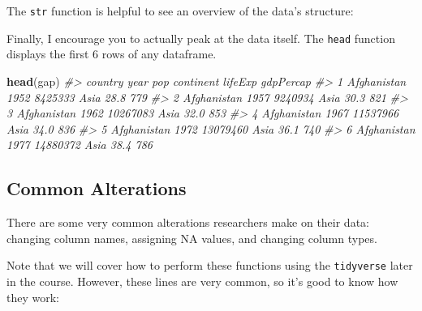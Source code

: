 \documentclass[]{book}
\newenvironment{Shaded}{\begin{snugshade}}{\end{snugshade}}
\newcommand{\CommentTok}[1]{\textcolor[rgb]{0.56,0.35,0.01}{\textit{#1}}}
\newcommand{\KeywordTok}[1]{\textcolor[rgb]{0.13,0.29,0.53}{\textbf{#1}}}
\newcommand{\NormalTok}[1]{#1}
\begin{document}
The \texttt{str} function is helpful to see an overview of the data's structure:

\begin{Shaded}
\end{Shaded}

Finally, I encourage you to actually peak at the data itself. The \texttt{head} function displays the first 6 rows of any dataframe.

\begin{Shaded}
\begin{Highlighting}[]
\KeywordTok{head}\NormalTok{(gap)}
\CommentTok{#>       country year      pop continent lifeExp gdpPercap}
\CommentTok{#> 1 Afghanistan 1952  8425333      Asia    28.8       779}
\CommentTok{#> 2 Afghanistan 1957  9240934      Asia    30.3       821}
\CommentTok{#> 3 Afghanistan 1962 10267083      Asia    32.0       853}
\CommentTok{#> 4 Afghanistan 1967 11537966      Asia    34.0       836}
\CommentTok{#> 5 Afghanistan 1972 13079460      Asia    36.1       740}
\CommentTok{#> 6 Afghanistan 1977 14880372      Asia    38.4       786}
\end{Highlighting}
\end{Shaded}

\hypertarget{common-alterations}{%
\subsection{Common Alterations}\label{common-alterations}}

There are some very common alterations researchers make on their data: changing column names, assigning NA values, and changing column types.

Note that we will cover how to perform these functions using the \texttt{tidyverse} later in the course. However, these lines are very common, so it's good to know how they work:
\end{document}
